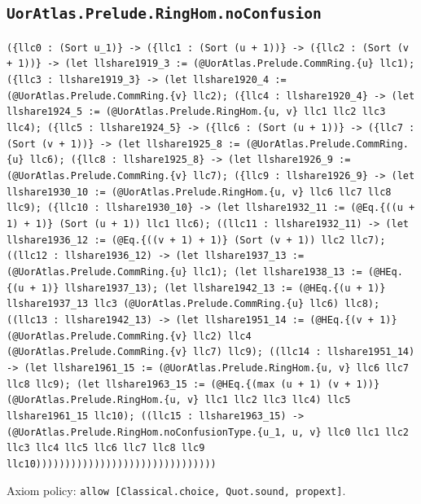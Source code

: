 \documentclass[11pt]{article}
\begin{document}
\subsection*{\texttt{UorAtlas.Prelude.RingHom.noConfusion}}
\noindent\texttt{(\{llc0 : (Sort u\_1)\} -> (\{llc1 : (Sort (u + 1))\} -> (\{llc2 : (Sort (v + 1))\} -> (let llshare1919\_3 := (@UorAtlas.Prelude.CommRing.\{u\} llc1); (\{llc3 : llshare1919\_3\} -> (let llshare1920\_4 := (@UorAtlas.Prelude.CommRing.\{v\} llc2); (\{llc4 : llshare1920\_4\} -> (let llshare1924\_5 := (@UorAtlas.Prelude.RingHom.\{u, v\} llc1 llc2 llc3 llc4); (\{llc5 : llshare1924\_5\} -> (\{llc6 : (Sort (u + 1))\} -> (\{llc7 : (Sort (v + 1))\} -> (let llshare1925\_8 := (@UorAtlas.Prelude.CommRing.\{u\} llc6); (\{llc8 : llshare1925\_8\} -> (let llshare1926\_9 := (@UorAtlas.Prelude.CommRing.\{v\} llc7); (\{llc9 : llshare1926\_9\} -> (let llshare1930\_10 := (@UorAtlas.Prelude.RingHom.\{u, v\} llc6 llc7 llc8 llc9); (\{llc10 : llshare1930\_10\} -> (let llshare1932\_11 := (@Eq.\{((u + 1) + 1)\} (Sort (u + 1)) llc1 llc6); ((llc11 : llshare1932\_11) -> (let llshare1936\_12 := (@Eq.\{((v + 1) + 1)\} (Sort (v + 1)) llc2 llc7); ((llc12 : llshare1936\_12) -> (let llshare1937\_13 := (@UorAtlas.Prelude.CommRing.\{u\} llc1); (let llshare1938\_13 := (@HEq.\{(u + 1)\} llshare1937\_13); (let llshare1942\_13 := (@HEq.\{(u + 1)\} llshare1937\_13 llc3 (@UorAtlas.Prelude.CommRing.\{u\} llc6) llc8); ((llc13 : llshare1942\_13) -> (let llshare1951\_14 := (@HEq.\{(v + 1)\} (@UorAtlas.Prelude.CommRing.\{v\} llc2) llc4 (@UorAtlas.Prelude.CommRing.\{v\} llc7) llc9); ((llc14 : llshare1951\_14) -> (let llshare1961\_15 := (@UorAtlas.Prelude.RingHom.\{u, v\} llc6 llc7 llc8 llc9); (let llshare1963\_15 := (@HEq.\{(max (u + 1) (v + 1))\} (@UorAtlas.Prelude.RingHom.\{u, v\} llc1 llc2 llc3 llc4) llc5 llshare1961\_15 llc10); ((llc15 : llshare1963\_15) -> (@UorAtlas.Prelude.RingHom.noConfusionType.\{u\_1, u, v\} llc0 llc1 llc2 llc3 llc4 llc5 llc6 llc7 llc8 llc9 llc10)))))))))))))))))))))))))))))))}\par
\noindent Axiom policy: \texttt{allow [Classical.choice, Quot.sound, propext]}.\par
\end{document}
